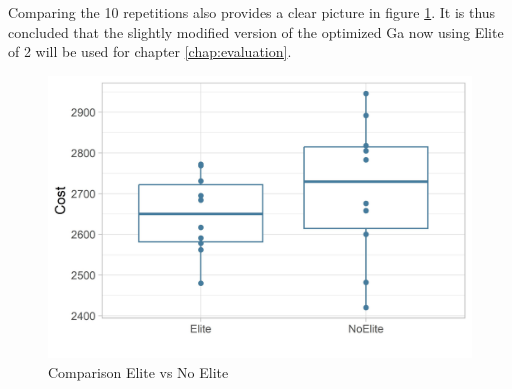 Comparing the 10 repetitions also provides a clear picture in figure \ref{figure:elite_comparison}. It is thus concluded that the slightly modified version of the optimized Ga now using Elite of 2 will be used for chapter \ref{chap:evaluation}.

\begin{figure}[ht] 
	\label{figure:elite_comparison}
	\includegraphics[width=1\linewidth]{simulations/evaluation/plots/elite_vs_no_elite}
	\caption{Comparison Elite vs No Elite}
\end{figure}



